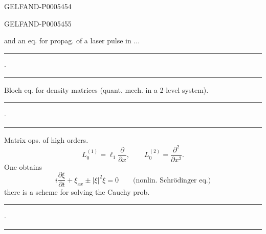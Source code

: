 \begin{GelfandAdjacentEvidence}{GELFAND-P000545}{4}

\end{GelfandAdjacentEvidence}
\begin{GelfandAdjacentEvidence}{GELFAND-P000545}{5}

and an eq. for propag. of a laser pulse in \(\ldots\)
\end{GelfandAdjacentEvidence}

\hfill\rule{1.1cm}{.35pt}\enspace\(\cdot\)\enspace\rule{1.4cm}{.35pt}\par

Bloch eq. for density matrices (quant. mech. in a 2-level system).
\hfill\rule{1.1cm}{.35pt}\enspace\(\cdot\)\enspace\rule{1.4cm}{.35pt}\par

Matrix ops. of high orders.
\[
L_0^{(1)}=\ell_1\frac{\partial}{\partial x},\qquad
L_0^{(2)}=\frac{\partial^2}{\partial x^2}.
\]
One obtains
\[
i\frac{\partial\xi}{\partial t}+\xi_{xx}\pm|\xi|^2\xi=0
\qquad\text{(nonlin. Schrödinger eq.)}
\]
there is a scheme for solving the Cauchy prob.
\hfill\rule{1.4cm}{.35pt}\enspace\(\cdot\)\enspace\rule{1.3cm}{.35pt}\par



